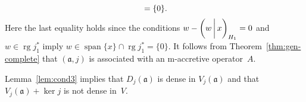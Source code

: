 \documentclass[a4paper,oneside,12pt]{amsart}
\theoremstyle{plain}
\theoremstyle{definition}
\newenvironment{example}
{\pushQED{\qed}

\examplex}
{\popQED\endexamplex}
\begin{document}
\begin{example}
\[{{\ifthenelse{\equal{auto}{B}}{\Bigl\{{(0,{{\ifthenelse{\equal{auto}{auto}}{\left({w}\mkern3mu{\biggm|}\mkern3mu {x}\right)}{}
\ifthenelse{\equal{auto}{b}}{\bigl({w}\mkern3mu{\biggm|}\mkern3mu {x}\bigr)}{}
\ifthenelse{\equal{auto}{B}}{\Bigl({w}\mkern3mu{\bigm|}\mkern3mu {x}\Bigr)}{}
}}_{H_1})}{:} {w\in\operatorname{rg} j_1^*,\ w-{{\ifthenelse{\equal{auto}{auto}}{\left({w}\mkern3mu{\biggm|}\mkern3mu {x}\right)}{}
\ifthenelse{\equal{auto}{b}}{\bigl({w}\mkern3mu{\biggm|}\mkern3mu {x}\bigr)}{}
\ifthenelse{\equal{auto}{B}}{\Bigl({w}\mkern3mu{\bigm|}\mkern3mu {x}\Bigr)}{}
}}_{H_1}x=0}\Bigr\}}{}
}} = \{0\}.
\]
Here the last equality holds since the conditions $w-{{\ifthenelse{\equal{auto}{auto}}{\left({w}\mkern3mu{\biggm|}\mkern3mu {x}\right)}{}
\ifthenelse{\equal{auto}{b}}{\bigl({w}\mkern3mu{\biggm|}\mkern3mu {x}\bigr)}{}
\ifthenelse{\equal{auto}{B}}{\Bigl({w}\mkern3mu{\bigm|}\mkern3mu {x}\Bigr)}{}
}}_{H_1}=0$ and $w\in\operatorname{rg} j_1^*$ imply $w\in\operatorname{span}\{x\}\cap\operatorname{rg} j_1^*=\{0\}$.
It follows from Theorem~\ref{thm:gen-complete} that $({{\mathfrak{{a}}}},j)$ is associated with an {\ensuremath{\text{m}}}-accretive operator~$A$. 

Lemma~\ref{lem:cond3} implies that $D_j({{\mathfrak{{a}}}})$ is dense in $V_j({{\mathfrak{{a}}}})$ and that $V_j({{\mathfrak{{a}}}})+\ker j$ is not dense in~$V$.


\end{example}
\end{document}
